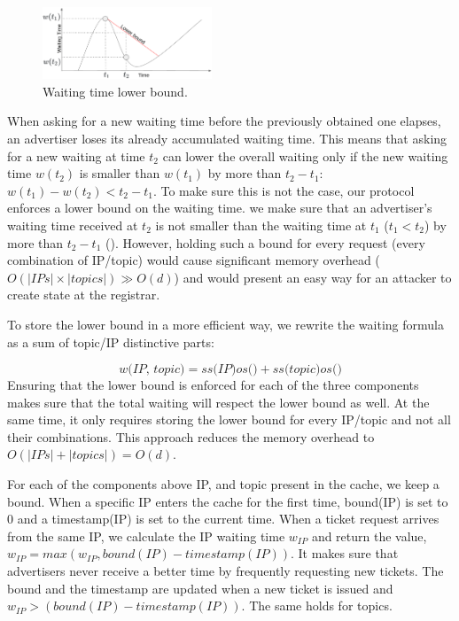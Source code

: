 \begin{figure}
    \includegraphics[width=0.45\textwidth]{img/lower_bound.png}
    \caption{Waiting time lower bound.}
    \label{fig:lower_bound}
\end{figure}

When asking for a new waiting time before the previously obtained one elapses,
an advertiser loses its already accumulated waiting time. This means that
asking for a new waiting at time $t_2$ can lower the overall waiting only if
the new waiting time $w(t_2)$ is smaller than $w(t_1)$ by more than $t_2 - t_1$: $w(t_1) - w(t_2) < t_2 - t_1$.
To make sure this is not the case, our protocol enforces a lower bound on the
waiting time. \Ie we make sure that an advertiser's waiting time received at
$t_2$ is not smaller than the waiting time at $t_1$ ($t_1 < t_2$) by more than
$t_2 - t_1$ ().
However, holding such a bound for every request (\ie every combination of IP/topic) would cause significant memory overhead ($O(|IPs|\times|topics|)  \gg O(d)$) and would present an easy way for an attacker to create state at the registrar. 

To store the lower bound in a more efficient way, we rewrite the waiting formula as a sum of topic/IP distinctive parts:

\begin{equation}
    \textit{w(IP, topic)} = 
    \textit{ss(IP)}\textit{os()} + 
    \textit{ss(topic)}\textit{os()}
\end{equation}
Ensuring that the lower bound is enforced for each of the three components
makes sure that the total waiting will respect the lower bound as well. At the
same time, it only requires storing the lower bound for every IP/topic and not all their combinations. This approach reduces the memory overhead to $O(|IPs|+|topics|) = O(d)$.

For each of the components above IP, and topic present in the cache, we
keep a bound. When a specific IP enters the cache for the first time, bound(IP)
is set to 0 and a timestamp(IP) is set to the current time. When a ticket
request arrives from the same IP, we calculate the IP waiting time $w_{IP}$ and
return the value, $w_{IP} = max(w_{IP}, bound(IP) - timestamp(IP))$. It makes sure that advertisers never receive a better time by frequently requesting new tickets. The bound and the timestamp are updated when a new ticket is issued and $w_{IP} > (bound(IP) - timestamp(IP))$. The same holds for topics.


